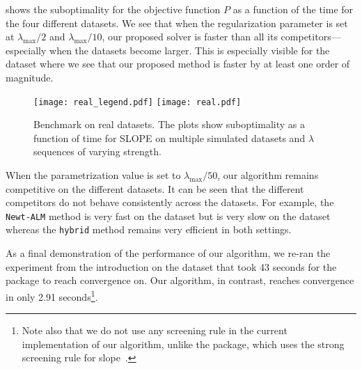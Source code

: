  shows the suboptimality for the objective function $P$ as a function of the time for the four different datasets.
We see that when the regularization parameter is set at $\lambda_{\text{max}}/2$ and $\lambda_{\text{max}}/10$, our proposed solver is faster than all its competitors---especially when the datasets become larger.
This is especially visible for the  dataset where we see that our proposed method is faster by at least one order of magnitude.

\begin{figure*}[!t]
  \centering
  \texttt{[image: real\_legend.pdf]}
  \texttt{[image: real.pdf]}
  \caption{Benchmark on real datasets. The plots show suboptimality as a function of time for SLOPE on multiple simulated datasets and $\lambda$ sequences of varying strength.}
  \label{fig:real-data}
\end{figure*}

When the parametrization value is set to $\lambda_{\text{max}}/50$, our algorithm remains competitive on the different datasets.
It can be seen that the different competitors do not behave consistently across the datasets.
For example, the \texttt{Newt-ALM} method is very fast on the  dataset but is very slow on the  dataset whereas the \texttt{hybrid} method remains very efficient in both settings.

As a final demonstration of the performance of our algorithm, we re-ran the experiment from the introduction on the  dataset that took 43 seconds for the  package to reach convergence on.
Our algorithm, in contrast, reaches convergence in only 2.91 seconds\footnote{Note also that we do not use any screening rule in the current implementation of our algorithm, unlike the  package, which uses the strong screening rule for slope~\parencite{larsson2020c}.}.
